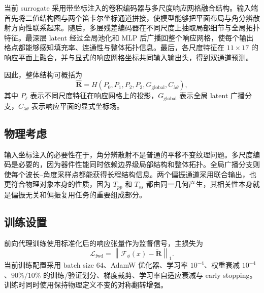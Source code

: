 \documentclass[10pt,a4paper]{article}
\newcommand{\tp}{T_{pp}}
\newcommand{\ts}{T_{ss}}
\newcommand{\loss}{\mathcal{L}}
\newcommand{\Rpred}{\widehat{\mathbf{R}}}
\begin{document}
当前 surrogate 采用带坐标注入的卷积编码器与多尺度响应网格融合结构。输入端首先将二值结构图与两个笛卡尔坐标通道拼接，使模型能够把平面布局与角分辨散射方向性联系起来。随后，多层残差编码器在不同尺度上抽取局部细节与全局拓扑特征。最深层 latent 经过全局池化和 MLP 后广播回整个响应网格，使每个输出格点都能够感知填充率、连通性与整体拓扑信息。最后，各尺度特征在 $11\times17$ 的响应平面上融合，并与显式的响应网格坐标共同输入输出头，得到双通道预测。

因此，整体结构可概括为
\begin{equation}
\Rpred = H\!\left(P_0,P_1,P_2,P_3,G_{\mathrm{global}},C_{\lambda\theta}\right),
\end{equation}
其中 $P_\ell$ 表示不同尺度特征在响应网格上的投影，$G_{\mathrm{global}}$ 表示全局 latent 广播分支，$C_{\lambda\theta}$ 表示响应平面的显式坐标场。

\subsection{物理考虑}

输入坐标注入的必要性在于，角分辨散射不是普通的平移不变纹理问题。多尺度编码是必要的，因为器件性能同时依赖边界级局部结构和整体拓扑。全局广播分支则使每个波长--角度采样点都能获得长程结构信息。两个偏振通道采用联合输出，也更符合物理对象本身的性质，因为 $\tp$ 和 $\ts$ 都由同一几何产生，其相关性本身就是偏振无关和偏振复用任务的重要组成部分。

\subsection{训练设置}

前向代理训练使用标准化后的响应张量作为监督信号，主损失为
\begin{equation}
\loss_{\mathrm{fwd}}=\left\|\mathcal{F}_{\phi}(x)-\widetilde{\mathbf{R}}\right\|_1.
\end{equation}
当前训练配置采用 batch size $64$、AdamW 优化器、学习率 $10^{-4}$、权重衰减 $10^{-4}$、$90\%/10\%$ 的训练/验证划分、梯度裁剪、学习率自适应衰减与 early stopping。训练时同时使用保持物理定义不变的对称翻转增强。
\end{document}
